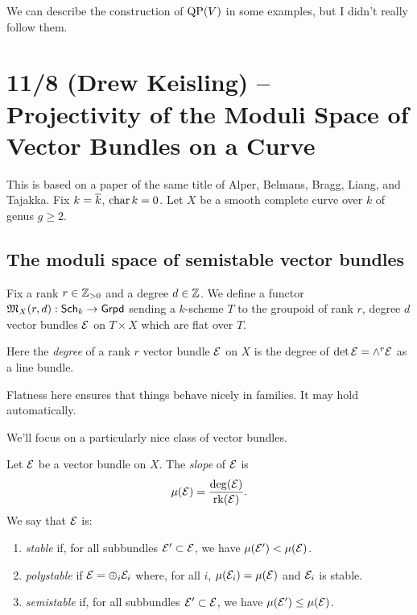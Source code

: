 \documentclass{amsart}
\begin{document}
We can describe the construction of $\mathrm{QP}(V)$ in some examples, but I didn't really follow them.

\section{11/8 (Drew Keisling) -- Projectivity of the Moduli Space of Vector Bundles on a Curve}

This is based on a paper of the same title of Alper, Belmans, Bragg, Liang, and Tajakka.
Fix $k = \overline{k}$, $\operatorname{char} k = 0$.
Let $X$ be a smooth complete curve over $k$ of genus $g \geq 2$.

\subsection{The moduli space of semistable vector bundles}

\begin{dfn}
	Fix a rank $r \in \mathbb{Z}_{>0}$ and a degree $d \in \mathbb{Z}$.
	We define a functor $\mathfrak{M}_X(r, d): \mathsf{Sch}_k \to \mathsf{Grpd}$ sending a $k$-scheme $T$ to the groupoid of rank $r$, degree $d$ vector bundles $\mathcal{E}$ on $T \times X$ which are flat over $T$.
\end{dfn}

Here the \emph{degree} of a rank $r$ vector bundle $\mathcal{E}$ on $X$ is the degree of $\det \mathcal{E} = \wedge^r \mathcal{E}$ as a line bundle.

\begin{rmk}
	Flatness here ensures that things behave nicely in families.
	It may hold automatically.
\end{rmk}

We'll focus on a particularly nice class of vector bundles.

\begin{dfn}
	Let $\mathcal{E}$ be a vector bundle on $X$.
	The \emph{slope} of $\mathcal{E}$ is 
	\[
		\mu(\mathcal{E}) = \frac{\deg(\mathcal{E})}{\operatorname{rk}(\mathcal{E})}.
	\]
	We say that $\mathcal{E}$ is:
	\begin{enumerate}
		\item \emph{stable} if, for all subbundles $\mathcal{E}' \subset \mathcal{E}$, we have $\mu(\mathcal{E}') < \mu(\mathcal{E})$.
		\item \emph{polystable} if $\mathcal{E} = \oplus_i \mathcal{E}_i$ where, for all $i$, $\mu(\mathcal{E}_i) = \mu(\mathcal{E})$ and $\mathcal{E}_i$ is stable.
		\item \emph{semistable} if, for all subbundles $\mathcal{E}' \subset \mathcal{E}$, we have $\mu(\mathcal{E}') \leq \mu(\mathcal{E})$.
	\end{enumerate}
\end{dfn}
\end{document}
